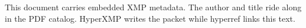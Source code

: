 \documentclass{article}
\begin{document}
This document carries embedded XMP metadata.
The author and title ride along in the PDF catalog.
HyperXMP writes the packet while hyperref links this text.
\end{document}
